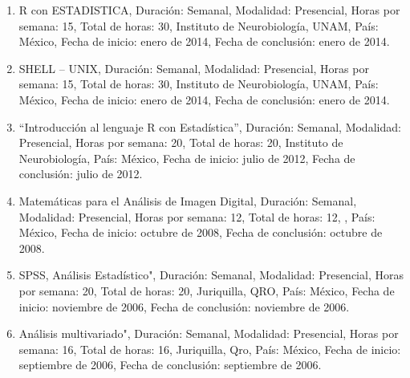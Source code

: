 \begin{enumerate}
\item R con ESTADISTICA, Duración: Semanal, Modalidad: Presencial, Horas por semana: 15, Total de horas: 30, Instituto de 
Neurobiología, UNAM, País: México, Fecha de inicio: enero de 2014, Fecha de conclusión: enero de 2014.

\item SHELL – UNIX, Duración: Semanal, Modalidad: Presencial, Horas por semana: 15, Total de horas: 30, Instituto de 
Neurobiología, UNAM, País: México, Fecha de inicio: enero de 2014, Fecha de conclusión: enero de 2014.

\item “Introducción al lenguaje R con Estadística”, Duración: Semanal, Modalidad: Presencial, Horas por semana: 20, Total de 
horas: 20, Instituto de Neurobiología, País: México, Fecha de inicio: julio de 2012, Fecha de conclusión: julio de 2012.

\item Matemáticas para el Análisis de Imagen Digital, Duración: Semanal, Modalidad: Presencial, Horas por semana: 12, Total 
de horas: 12, , País: México, Fecha de inicio: octubre de 2008, Fecha de conclusión: octubre de 2008.

\item SPSS, Análisis Estadístico", Duración: Semanal, Modalidad: Presencial, Horas por semana: 20, Total de horas: 20, 
Juriquilla, QRO, País: México, Fecha de inicio: noviembre de 2006, Fecha de conclusión: noviembre de 2006.

\item Análisis multivariado", Duración: Semanal, Modalidad: Presencial, Horas por semana: 16, Total de horas: 16, Juriquilla, 
Qro, País: México, Fecha de inicio: septiembre de 2006, Fecha de conclusión: septiembre de 2006.

\end{enumerate}

